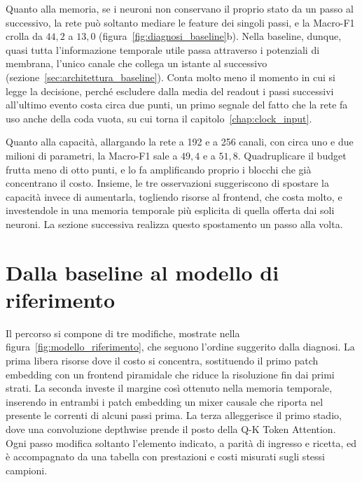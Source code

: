 Quanto alla memoria, se i neuroni non conservano il proprio stato da un passo al successivo, la rete può soltanto mediare le feature dei singoli passi, e la Macro-F1 crolla da $44{,}2$ a $13{,}0$ (figura~\ref{fig:diagnosi_baseline}b). Nella baseline, dunque, quasi tutta l'informazione temporale utile passa attraverso i potenziali di membrana, l'unico canale che collega un istante al successivo (sezione~\ref{sec:architettura_baseline}). Conta molto meno il momento in cui si legge la decisione, perché escludere dalla media del readout i passi successivi all'ultimo evento costa circa due punti, un primo segnale del fatto che la rete fa uso anche della coda vuota, su cui torna il capitolo~\ref{chap:clock_input}.

Quanto alla capacità, allargando la rete a 192 e a 256 canali, con circa uno e due milioni di parametri, la Macro-F1 sale a $49{,}4$ e a $51{,}8$. Quadruplicare il budget frutta meno di otto punti, e lo fa amplificando proprio i blocchi che già concentrano il costo. Insieme, le tre osservazioni suggeriscono di spostare la capacità invece di aumentarla, togliendo risorse al frontend, che costa molto, e investendole in una memoria temporale più esplicita di quella offerta dai soli neuroni. La sezione successiva realizza questo spostamento un passo alla volta.



\section{Dalla baseline al modello di riferimento}
\label{sec:percorso_riferimento}

Il percorso si compone di tre modifiche, mostrate nella figura~\ref{fig:modello_riferimento}, che seguono l'ordine suggerito dalla diagnosi. La prima libera risorse dove il costo si concentra, sostituendo il primo patch embedding con un frontend piramidale che riduce la risoluzione fin dai primi strati. La seconda investe il margine così ottenuto nella memoria temporale, inserendo in entrambi i patch embedding un mixer causale che riporta nel presente le correnti di alcuni passi prima. La terza alleggerisce il primo stadio, dove una convoluzione depthwise prende il posto della Q-K Token Attention. Ogni passo modifica soltanto l'elemento indicato, a parità di ingresso e ricetta, ed è accompagnato da una tabella con prestazioni e costi misurati sugli stessi campioni.

